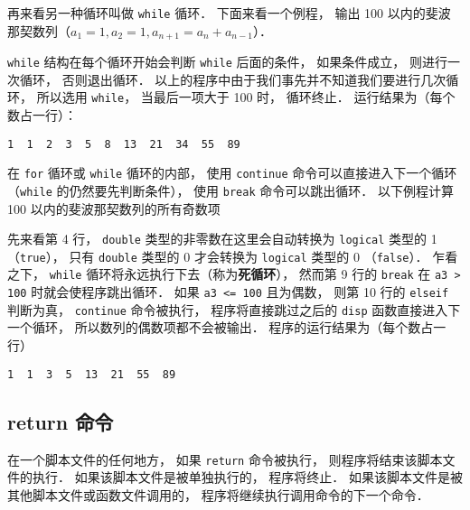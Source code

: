再来看另一种循环叫做 \lstinline|while| 循环． 下面来看一个例程， 输出 100 以内的斐波那契数列（$a_1 = 1, a_2 = 1, a_{n+1} = a_{n} + a_{n-1}$）．


\lstinline|while| 结构在每个循环开始会判断 \lstinline|while| 后面的条件， 如果条件成立， 则进行一次循环， 否则退出循环． 以上的程序中由于我们事先并不知道我们要进行几次循环， 所以选用 \lstinline|while|， 当最后一项大于 100 时， 循环终止． 运行结果为（每个数占一行）：
\begin{lstlisting}[language=MatlabCom]
1  1  2  3  5  8  13  21  34  55  89
\end{lstlisting}

在 \lstinline|for| 循环或 \lstinline|while| 循环的内部， 使用 \lstinline|continue| 命令可以直接进入下一个循环（\lstinline|while| 的仍然要先判断条件）， 使用 \lstinline|break| 命令可以跳出循环． 以下例程计算 100 以内的斐波那契数列的所有奇数项


先来看第 4 行， \lstinline|double| 类型的非零数在这里会自动转换为 \lstinline|logical| 类型的 1 （\lstinline|true|）， 只有 \lstinline|double| 类型的 0 才会转换为 \lstinline|logical| 类型的 0 （\lstinline|false|）． 乍看之下， \lstinline|while| 循环将永远执行下去（称为\textbf{死循环}）， 然而第 9 行的 \lstinline|break| 在 \lstinline|a3 > 100| 时就会使程序跳出循环． 如果 \lstinline|a3 <= 100| 且为偶数， 则第 10 行的 \lstinline|elseif| 判断为真， \lstinline|continue| 命令被执行， 程序将直接跳过之后的 \lstinline|disp| 函数直接进入下一个循环， 所以数列的偶数项都不会被输出． 程序的运行结果为（每个数占一行）
\begin{lstlisting}[language=MatlabCom]
1  1  3  5  13  21  55  89
\end{lstlisting}

\subsection{return 命令}
在一个脚本文件的任何地方， 如果 \lstinline|return| 命令被执行， 则程序将结束该脚本文件的执行． 如果该脚本文件是被单独执行的， 程序将终止． 如果该脚本文件是被其他脚本文件或函数文件调用的， 程序将继续执行调用命令的下一个命令．



